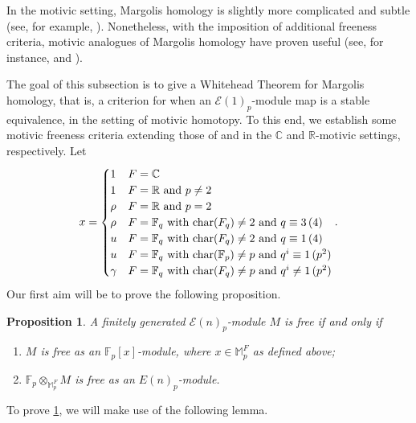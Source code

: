 \documentclass{amsart}
\newtheorem{proposition}[theorem]{Proposition}
\theoremstyle{plain}
\numberwithin{theorem}{section}
\numberwithin{equation}{section}
\numberwithin{figure}{section}
\newcommand{\mC}{{\mathbb C}}
\newcommand{\mF}{{\mathbb F}}
\newcommand{\mM}{{\mathbb M}}
\newcommand{\mR}{{\mathbb R}}
\newcommand{\cE}{{\mathcal E}}
\newcommand{\0}{\langle 0 \rangle }
\begin{document}
In the motivic setting, Margolis homology is slightly more complicated and subtle (see, for example, \cite[Example 4.6 and Proposition 4.7]{GheorgheIsaksenRicka18}). Nonetheless, with the imposition of additional freeness criteria, motivic analogues of Margolis homology have proven useful (see, for instance, \cite[Section 5]{HeardKrause18} and \cite[Section 2]{BhattacharyaGuillouLi22}). 

The goal of this subsection is to give a Whitehead Theorem for Margolis homology, that is, a criterion for when an $\cE(1)_p$-module map is a stable equivalence, in the setting of motivic homotopy. To this end, we establish some motivic freeness criteria extending those of \cite[Section 5]{HeardKrause18} and \cite[Section 2]{BhattacharyaGuillouLi22} in the $\mC$ and $\mR$-motivic settings, respectively. Let
\[
        x = \begin{cases}
            1 & F = \mC\\
            1 & F = \mR \text{ and } p \neq 2\\
            \rho & F = \mR \text{ and } p = 2 \\
            \rho & F = \mF_q \text{ with } \textup{char}({F_q}) \neq 2 \text{ and } q \equiv 3 \, (4) \\
            u & F = \mF_q \text{ with } \textup{char}({F_q}) \neq 2 \text{ and } q \equiv 1 \, (4) \\
            u & F = \mF_q \text{ with } \textup{char}(\mF_p) \neq p \text{ and } q^i \equiv 1 \, (p^2) \\
            \gamma & F = \mF_q \text{ with } \textup{char}(F_q) \neq p \text{ and } q^i \neq 1 \, (p^2)
            \end{cases}.
        \] 
Our first aim will be to prove the following proposition.
\begin{proposition} \label{prop:marg1}
    A finitely generated $\cE(n)_p$-module $M$ is free if and only if
    \begin{enumerate}
        \item $M$ is free as an $\mF_p[x]$-module, where $x \in \mM_p^F$ as defined above;
        \item $\mF_p \otimes_{\mM_p^F} M$ is free as an $E(n)_p$-module.
    \end{enumerate}
\end{proposition}
To prove \cref{prop:marg1}, we will make use of the following lemma. 
\end{document}
